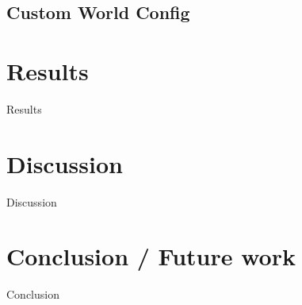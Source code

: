 \documentclass[10pt,journal,compsoc]{IEEEtran}
\begin{document}
\subsection{Custom World Config}

\section{Results}
Results


\section{Discussion}
Discussion

\section{Conclusion / Future work}
Conclusion
\end{document}
